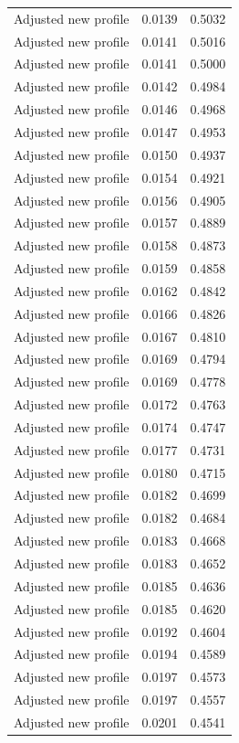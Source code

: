 \begin{table}[htbp]
\begin{tabular}{lll}
Adjusted new profile & 0.0139 & 0.5032 \\
Adjusted new profile & 0.0141 & 0.5016 \\
Adjusted new profile & 0.0141 & 0.5000 \\
Adjusted new profile & 0.0142 & 0.4984 \\
Adjusted new profile & 0.0146 & 0.4968 \\
Adjusted new profile & 0.0147 & 0.4953 \\
Adjusted new profile & 0.0150 & 0.4937 \\
Adjusted new profile & 0.0154 & 0.4921 \\
Adjusted new profile & 0.0156 & 0.4905 \\
Adjusted new profile & 0.0157 & 0.4889 \\
Adjusted new profile & 0.0158 & 0.4873 \\
Adjusted new profile & 0.0159 & 0.4858 \\
Adjusted new profile & 0.0162 & 0.4842 \\
Adjusted new profile & 0.0166 & 0.4826 \\
Adjusted new profile & 0.0167 & 0.4810 \\
Adjusted new profile & 0.0169 & 0.4794 \\
Adjusted new profile & 0.0169 & 0.4778 \\
Adjusted new profile & 0.0172 & 0.4763 \\
Adjusted new profile & 0.0174 & 0.4747 \\
Adjusted new profile & 0.0177 & 0.4731 \\
Adjusted new profile & 0.0180 & 0.4715 \\
Adjusted new profile & 0.0182 & 0.4699 \\
Adjusted new profile & 0.0182 & 0.4684 \\
Adjusted new profile & 0.0183 & 0.4668 \\
Adjusted new profile & 0.0183 & 0.4652 \\
Adjusted new profile & 0.0185 & 0.4636 \\
Adjusted new profile & 0.0185 & 0.4620 \\
Adjusted new profile & 0.0192 & 0.4604 \\
Adjusted new profile & 0.0194 & 0.4589 \\
Adjusted new profile & 0.0197 & 0.4573 \\
Adjusted new profile & 0.0197 & 0.4557 \\
Adjusted new profile & 0.0201 & 0.4541 \\

\end{tabular}
\end{table}
